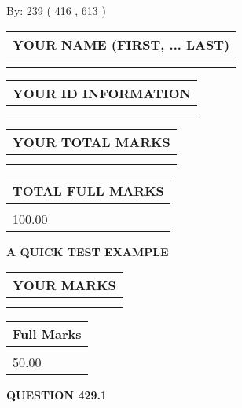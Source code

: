 \documentclass[12pt]{article}
\begin{document}
   
\hspace{1.0in} By: 
 239 ( 416 ,  613 )
   
   
   
   
\newpage 
\setcounter{page}{ 
   429001 } 
   
   
   
   
\noindent\begin{tabular}{|l|}
\hline
YOUR NAME (FIRST, ... LAST)  \\
\hline
 \\ 
 \\ 
\hline
\end{tabular}
\hspace{0.05in} \begin{tabular}{|l|}
\hline
 YOUR   ID   INFORMATION  \\
\hline
 \\ 
 \\ 
\hline
\end{tabular}
   
   
\vspace{0.2in}\noindent\begin{tabular}{|l|}
\hline
YOUR TOTAL MARKS  \\
\hline
 \\ 
 \\ 
\hline
\end{tabular}
\hspace{0.05in} \begin{tabular}{|l|}
\hline
TOTAL FULL MARKS  \\
\hline
 \\ 
100.00 \\
\hline
\end{tabular}
   
   
 \vspace{0.2in}
{\LARGE {\textbf{ A QUICK TEST EXAMPLE}}}
   
   
  
\vspace{0.2in}
  
\noindent\begin{tabular}{|l|}
\hline
 YOUR MARKS  \\
\hline
 \\ 
 \\ 
\hline
\end{tabular}
\hspace{0.05in} \begin{tabular}{|l|}
\hline
 Full Marks  \\
\hline
 \\ 
50.00 \\
\hline
\end{tabular}
{\textbf{\Large{QUESTION
429.1 
}}}
  
\end{document}
